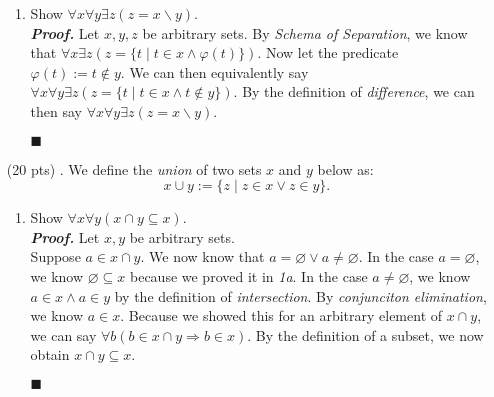 \documentclass[11pt,a4paper]{article}
\begin{document}
\begin{enumerate}
\begin{enumerate}
        \item 
        Show $\forall x \forall y \exists z (z = x \backslash y)$. \\
        \emph{\textbf{Proof.}} Let $x, y, z$ be arbitrary sets. By \emph{Schema of Separation}, we know that $\forall x \exists z (z = \{t \mid t \in x \land \varphi (t) \} ).  $ 
        Now let the predicate $\varphi (t) := t \notin y  $. We can then equivalently say $\forall x \forall y \exists z (z = \{t \mid t \in x \land t \notin y \} ).  $ 
        By the definition of \emph{difference}, we can then say $\forall x \forall y \exists z (z = x \backslash y ).  $ 
        \begin{flushright}
            $\blacksquare$
        \end{flushright}
    \end{enumerate}
    \item[(20 pts) \quad 3.]
    We define the \emph{union} of two sets $x$ and $y$ below as: 
    \begin{equation*}
        x \cup y := \{z \mid z \in x \lor z \in y \}.
    \end{equation*}
    \begin{enumerate}
        
        \item 
        Show $\forall x \forall y (x \cap y \subseteq x)$. \\
        \emph{\textbf{Proof.}} Let $x, y$ be arbitrary sets. \\
        Suppose $a \in x \cap y$. We now know that $a = \varnothing \lor a \neq \varnothing$.
        In the case $a = \varnothing$, we know $\varnothing \subseteq x$ because we proved it in \emph{1a}.
        In the case $a \neq \varnothing$, we know $a \in x \land a \in y$ by the definition of \emph{intersection}. By \emph{conjunciton elimination}, we know $a \in x$. Because we showed this for an arbitrary element of $x \cap y$, we can say $\forall b (b \in x \cap y \Rightarrow b \in x)$.
        By the definition of a subset, we now obtain $x \cap y \subseteq x$. 
        \begin{flushright}
            $\blacksquare$
        \end{flushright}


\end{enumerate}
\end{enumerate}
\end{document}
